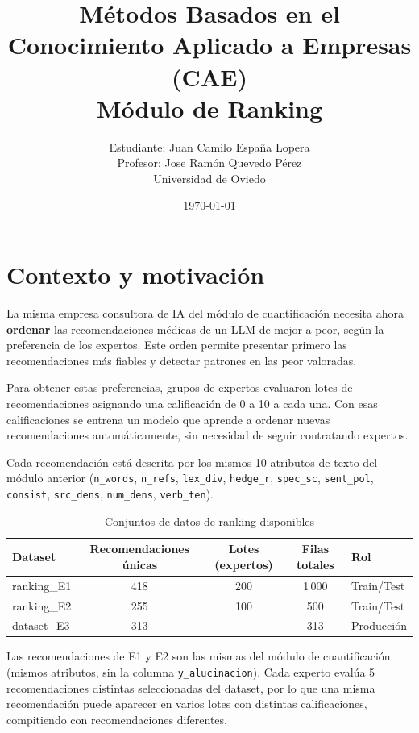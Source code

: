 \documentclass[11pt,a4paper]{article}
\title{Métodos Basados en el Conocimiento Aplicado a Empresas (CAE)\\
       Módulo de Ranking}
\author{
Estudiante: Juan Camilo España Lopera\\
Profesor: Jose Ramón Quevedo Pérez\\[6pt]
Universidad de Oviedo
}
\date{\today}
\begin{document}
\maketitle


\section{Contexto y motivación}

La misma empresa consultora de IA del módulo de cuantificación necesita ahora
\textbf{ordenar} las recomendaciones médicas de un LLM de mejor a peor, según
la preferencia de los expertos. Este orden permite presentar primero las
recomendaciones más fiables y detectar patrones en las peor valoradas.

Para obtener estas preferencias, grupos de expertos evaluaron lotes de
recomendaciones asignando una calificación de 0 a 10 a cada una. Con esas
calificaciones se entrena un modelo que aprende a ordenar nuevas
recomendaciones automáticamente, sin necesidad de seguir contratando expertos.

Cada recomendación está descrita por los mismos 10 atributos de texto del
módulo anterior (\texttt{n\_words}, \texttt{n\_refs}, \texttt{lex\_div},
\texttt{hedge\_r}, \texttt{spec\_sc}, \texttt{sent\_pol}, \texttt{consist},
\texttt{src\_dens}, \texttt{num\_dens}, \texttt{verb\_ten}).

\begin{table}[H]
\centering
\caption{Conjuntos de datos de ranking disponibles}
\begin{tabular}{lcccl}
\toprule
\textbf{Dataset} & \textbf{Recomendaciones únicas} & \textbf{Lotes (expertos)} & \textbf{Filas totales} & \textbf{Rol} \\
\midrule
ranking\_E1 & 418 & 200 & 1\,000 & Train/Test \\
ranking\_E2 & 255 & 100 &   500  & Train/Test \\
dataset\_E3 & 313 &  -- &   313  & Producción \\
\bottomrule
\end{tabular}
\end{table}

Las recomendaciones de E1 y E2 son las mismas del módulo de cuantificación
(mismos atributos, sin la columna \texttt{y\_alucinacion}). Cada experto
evalúa 5 recomendaciones distintas seleccionadas del dataset, por lo que una
misma recomendación puede aparecer en varios lotes con distintas calificaciones, compitiendo con recomendaciones diferentes.
\end{document}

